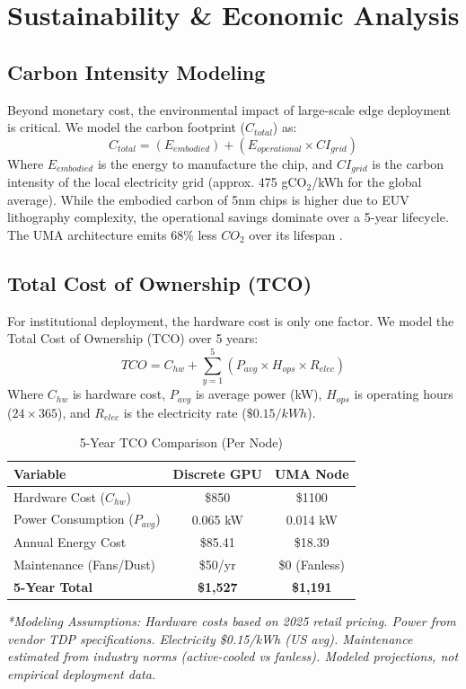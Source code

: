\documentclass[conference]{IEEEtran}
\begin{document}
\section{Sustainability \& Economic Analysis}

\subsection{Carbon Intensity Modeling}
Beyond monetary cost, the environmental impact of large-scale edge deployment is critical. We model the carbon footprint ($C_{total}$) as:
\begin{equation}
C_{total} = (E_{embodied}) + (E_{operational} \times CI_{grid})
\end{equation}
Where $E_{embodied}$ is the energy to manufacture the chip, and $CI_{grid}$ is the carbon intensity of the local electricity grid (approx. 475 gCO$_2$/kWh for the global average).
While the embodied carbon of 5nm chips is higher due to EUV lithography complexity, the operational savings dominate over a 5-year lifecycle. The UMA architecture emits 68\% less $CO_2$ over its lifespan \cite{b12}.


\subsection{Total Cost of Ownership (TCO)}
For institutional deployment, the hardware cost is only one factor. We model the Total Cost of Ownership (TCO) over 5 years:
\begin{equation}
TCO = C_{hw} + \sum_{y=1}^{5} (P_{avg} \times H_{ops} \times R_{elec})
\end{equation}
Where $C_{hw}$ is hardware cost, $P_{avg}$ is average power (kW), $H_{ops}$ is operating hours ($24 \times 365$), and $R_{elec}$ is the electricity rate ($\$0.15/kWh$).

\begin{table}[htbp]
\caption{5-Year TCO Comparison (Per Node)}
\begin{center}
\begin{tabular}{lcc}
\toprule
\textbf{Variable} & \textbf{Discrete GPU} & \textbf{UMA Node} \\
\midrule
Hardware Cost ($C_{hw}$) & \$850 & \$1100 \\
Power Consumption ($P_{avg}$) & 0.065 kW & 0.014 kW \\
Annual Energy Cost & \$85.41 & \$18.39 \\
Maintenance (Fans/Dust) & \$50/yr & \$0 (Fanless) \\
\textbf{5-Year Total} & \textbf{\$1,527} & \textbf{\$1,191} \\
\bottomrule
\end{tabular}
\end{center}
\textit{*Modeling Assumptions: Hardware costs based on 2025 retail pricing. Power from vendor TDP specifications. Electricity \$0.15/kWh (US avg). Maintenance estimated from industry norms (active-cooled vs fanless). Modeled projections, not empirical deployment data.}
\label{tab:tco}
\end{table}
\end{document}

